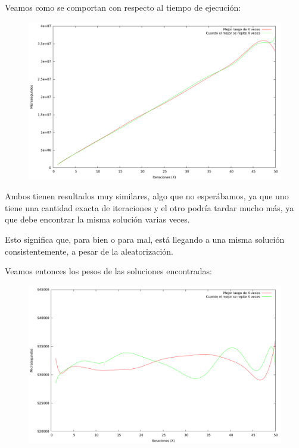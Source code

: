 Veamos como se comportan con respecto al tiempo de ejecución:

\vspace*{0.5cm}

\begin{figure}[H]
  \begin{center}
    \includegraphics[scale=0.35]{imagenes/grasp-criterio-tiempo.png}
  \end{center}
\end{figure}

\vspace*{0.5cm}

Ambos tienen resultados muy similares, algo que no esperábamos, ya que uno tiene
una cantidad exacta de iteraciones y el otro podría tardar mucho más, ya que
debe encontrar la misma solución varias veces.

Esto significa que, para bien o para mal, está llegando a una misma solución
consistentemente, a pesar de la aleatorización.

Veamos entonces los pesos de las soluciones encontradas:

\vspace*{0.5cm}

\begin{figure}[H]
  \begin{center}
    \includegraphics[scale=0.35]{imagenes/grasp-criterio-peso.png}
  \end{center}
\end{figure}

